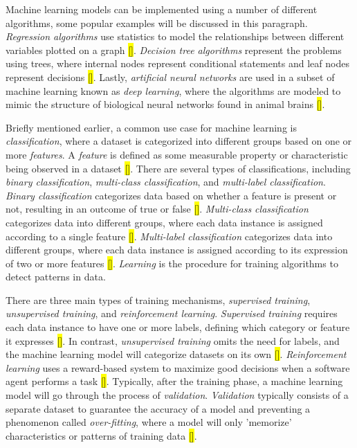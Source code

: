 \documentclass[11pt,conference]{IEEEtran}
\begin{document}
Machine learning models can be implemented using a number of different
algorithms, some popular examples will be discussed in this paragraph. \emph{Regression algorithms} use statistics to model the
relationships between different variables plotted on a graph \hl{[]}. \emph{Decision
tree algorithms} represent the problems using trees, where internal nodes represent conditional statements and leaf nodes
represent decisions \hl{[]}. Lastly, \emph{artificial neural networks} are used in a
subset of machine learning known as \emph{deep learning}, where the algorithms
are modeled to mimic the structure of biological neural networks found in
animal brains \hl{[]}.  

Briefly mentioned earlier, a common use case for machine learning is
\emph{classification}, where a dataset is categorized into different groups
based on one or more \emph{features}. A \emph{feature} is defined as some
measurable property or characteristic being observed in a dataset \hl{[]}. There are several types of
classifications, including \emph{binary classification}, \emph{multi-class
classification}, and \emph{multi-label classification}. \emph{Binary
classification} categorizes data based on whether a feature is present or not,
resulting in an outcome of true or false \hl{[]}. \emph{Multi-class classification}
categorizes data into different groups, where each data instance is assigned
according to a single feature \hl{[]}. \emph{Multi-label classification} categorizes data
into different groups, where each data instance is assigned according to its
expression of two or more features \hl{[]}.
\emph{Learning} is the procedure for training algorithms to detect patterns in
data. 

There are three main types of training mechanisms, \emph{supervised
training}, \emph{unsupervised training}, and \emph{reinforcement learning}. \emph{Supervised training} requires
each data instance to have one or more labels, defining which category or
feature it expresses \hl{[]}. In contrast, \emph{unsupervised training} omits the need
for labels, and the machine learning model will categorize datasets on its own
\hl{[]}.
\emph{Reinforcement learning} uses a reward-based system to maximize good
decisions when a software agent performs a task \hl{[]}.
Typically, after the training phase, a machine learning model will go through
the process of \emph{validation}. \emph{Validation} typically consists of a separate dataset to guarantee the accuracy of a model and
preventing a phenomenon called \emph{over-fitting}, where a model will only
'memorize' characteristics or patterns of training data \hl{[]}.
\end{document}
